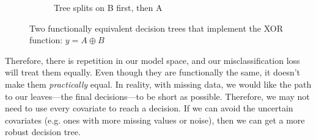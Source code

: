 \begin{example}
\begin{figure}[H]
\begin{subfigure}[b]{0.48\textwidth}
        \caption{Tree splits on B first, then A}
      \end{subfigure}
      \caption{Two functionally equivalent decision trees that implement the XOR function: $y = A \oplus B$}
    \end{figure} 
  \end{example}

  Therefore, there is repetition in our model space, and our misclassification loss will treat them equally. Even though they are functionally the same, it doesn't make them \textit{practically} equal. In reality, with missing data, we would like the path to our leaves---the final decisions---to be short as possible. Therefore, we may not need to use every covariate to reach a decision. If we can avoid the uncertain covariates (e.g. ones with more missing values or noise), then we can get a more robust decision tree. 

